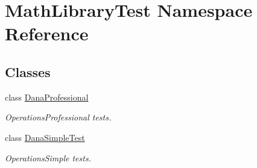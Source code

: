 \hypertarget{namespaceMathLibraryTest}{}\section{Math\+Library\+Test Namespace Reference}
\label{namespaceMathLibraryTest}
\subsection*{Classes}
\begin{DoxyCompactItemize}
\item 
class \hyperlink{classMathLibraryTest_1_1DanaProfessional}{Dana\+Professional}
\begin{DoxyCompactList}\small\item\em Operations\+Professional tests. \end{DoxyCompactList}\item 
class \hyperlink{classMathLibraryTest_1_1DanaSimpleTest}{Dana\+Simple\+Test}
\begin{DoxyCompactList}\small\item\em Operations\+Simple tests. \end{DoxyCompactList}\end{DoxyCompactItemize}
